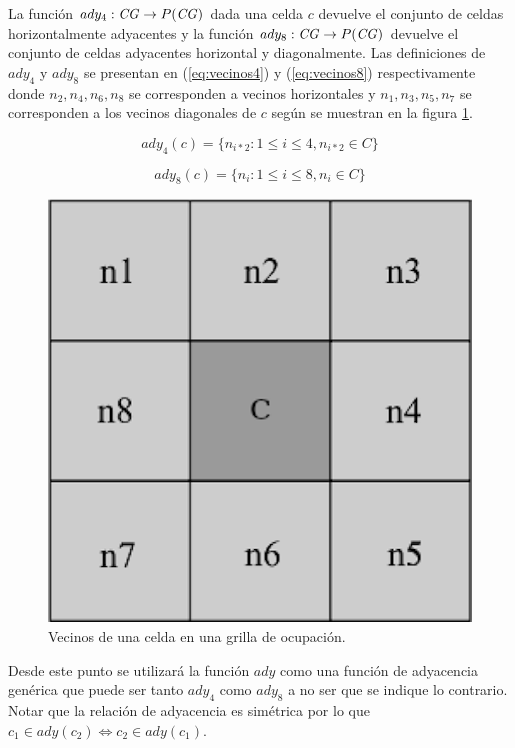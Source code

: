 
La función $ady_4 : \mathit{CG} \rightarrow P(\mathit{CG})$ dada una celda $c$ devuelve el conjunto
de celdas horizontalmente adyacentes y la función $ady_8 : \mathit{CG} \rightarrow P(\mathit{CG})$
devuelve el conjunto de celdas adyacentes horizontal y diagonalmente. Las
definiciones de $ady_4$ y $ady_8$ se presentan en (\ref{eq:vecinos4}) y
(\ref{eq:vecinos8}) respectivamente donde $n_2, n_4, n_6, n_8$ se corresponden
a vecinos horizontales y $n_1, n_3, n_5, n_7$ se corresponden a los vecinos
diagonales de $c$ según se muestran en la figura \ref{fig:vecinos}.

\begin{equation} 
 ady_4(c)=\{n_{i*2} : 1\leq i \leq 4, n_{i*2} \in C\}
 \label{eq:vecinos4}
\end{equation} 

\begin{equation} 
 ady_8(c)=\{n_i : 1\leq i \leq 8, n_i \in C\}
 \label{eq:vecinos8}
\end{equation} 

\begin{figure}[H]
  \center
  \includegraphics[width=0.3\linewidth]{imagenes/vecinosSharp.png}
  \caption[Vecinos de una celda en una grilla de ocupación.]{Vecinos de una celda en una grilla de ocupación.}
  \label{fig:vecinos}
\end{figure} 

Desde este punto se utilizará la función $ady$ como una función de adyacencia
genérica que puede ser tanto $ady_4$ como $ady_8$ a no ser que se indique lo
contrario.
Notar que la relación de adyacencia es simétrica por lo que $c_1 \in ady(c_2)
\Leftrightarrow c_2 \in ady(c_1)$.

